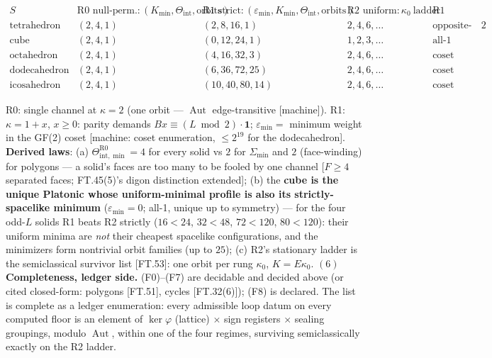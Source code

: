\begin{theorem}
\[
\begin{array}{c|c|c|c|c}
S & \text{R0 null-perm.}: (K_{\min},\Theta_{\mathrm{int}},\text{orbits}) & \text{R1 strict}: (\varepsilon_{\min},K_{\min},\Theta_{\mathrm{int}},\text{orbits}) & \text{R2 uniform}: \kappa_0\ \text{ladder} & \text{R1 witness type}\\ \hline
\text{tetrahedron} & (2,4,1) & (2,8,16,1) & 2,4,6,\dots & \text{opposite-edge pair at}\ 2\\
\text{cube} & (2,4,1) & (0,12,24,1) & 1,2,3,\dots & \text{all-1 profile (unique)}\\
\text{octahedron} & (2,4,1) & (4,16,32,3) & 2,4,6,\dots & \text{coset leaders, 3 orbits}\\
\text{dodecahedron} & (2,4,1) & (6,36,72,25) & 2,4,6,\dots & \text{coset leaders, 25 orbits}\\
\text{icosahedron} & (2,4,1) & (10,40,80,14) & 2,4,6,\dots & \text{coset leaders, 14 orbits}
\end{array}
\]

R0: single channel at $\kappa{=}2$ (one orbit — $\operatorname{Aut}$ edge-transitive [machine]). R1: $\kappa=1+x$, $x\ge0$: parity demands $Bx\equiv(L\bmod2)\cdot\mathbf1$; $\varepsilon_{\min}=$ minimum weight in the GF(2) coset [machine: coset enumeration, $\le2^{19}$ for the dodecahedron]. \textbf{Derived laws}: (a) $\Theta_{\mathrm{int},\min}^{\mathrm{R0}}=4$ for every solid vs $2$ for $\Sigma_{\min}$ and $2$ (face-winding) for polygons — a solid's faces are too many to be fooled by one channel [$F\ge4$ separated faces; FT.45(5)'s digon distinction extended]; (b) the \textbf{cube is the unique Platonic whose uniform-minimal profile is also its strictly-spacelike minimum} ($\varepsilon_{\min}=0$; all-1, unique up to symmetry) — for the four odd-$L$ solids R1 beats R2 strictly ($16{<}24$, $32{<}48$, $72{<}120$, $80{<}120$): their uniform minima are \textit{not} their cheapest spacelike configurations, and the minimizers form nontrivial orbit families (up to $25$); (c) R2's stationary ladder is the semiclassical survivor list [FT.53]: one orbit per rung $\kappa_0$, $K=E\kappa_0$. $(6)$ \textbf{Completeness, ledger side.} (F0)–(F7) are decidable and decided above (or cited closed-form: polygons [FT.51], cycles [FT.32(6)]); (F8) is declared. The list is complete as a ledger enumeration: every admissible loop datum on every computed floor is an element of $\ker\varphi$ (lattice) $\times$ sign registers $\times$ sealing groupings, modulo $\operatorname{Aut}$, within one of the four regimes, surviving semiclassically exactly on the R2 ladder.


\end{theorem}
